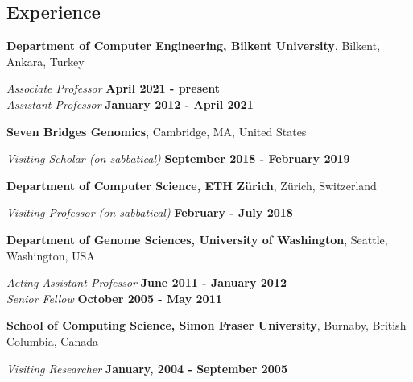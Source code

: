 \documentclass[margin,line]{res}
\newcommand{\junk}[1]{}
\begin{document}
\begin{resume}
          \section{\sc Experience}
                  {\bf Department of Computer Engineering, Bilkent University},
                  Bilkent, Ankara, Turkey
                  
                  \vspace{-.3cm}
                         {\em Associate Professor} \hfill {\bf April 2021 - present}\\ 
                         {\em Assistant Professor} \hfill {\bf January 2012 - April 2021} 

                 {\bf Seven Bridges Genomics},
                  Cambridge, MA, United States
                  
                  \vspace{-.1cm}
                         {\em Visiting Scholar (on sabbatical)} \hfill {\bf September 2018 - February 2019} 

                 {\bf Department of Computer Science, ETH Zürich},
                  Zürich, Switzerland
                  
                  \vspace{-.1cm}
                         {\em Visiting Professor (on sabbatical)} \hfill {\bf February - July 2018} 
                         
                 {\bf Department of Genome Sciences, University of Washington},
                         Seattle, Washington, USA
                         
                         \vspace{-.3cm}
                                {\em Acting Assistant Professor} \hfill {\bf June 2011 - January 2012} \\                           %
                                      {\em Senior Fellow} \hfill {\bf October 2005 - May 2011}
                                       
                          {\bf School of Computing Science, Simon Fraser University},
                          Burnaby, British Columbia, Canada

                          \vspace{-.3cm}
                                         {\em Visiting Researcher} \hfill {\bf January, 2004 - September 2005}\\
                                         \junk{
                                         Worked on RNA-RNA interaction prediction algorithms and RNA secondary structure
                                         motif discovery problems, collaborating with Peter Unrau, Kaizhong
                                         Zhang, and Jeremy Buhler.
                                         }
                                       

\end{resume}
\end{document}
